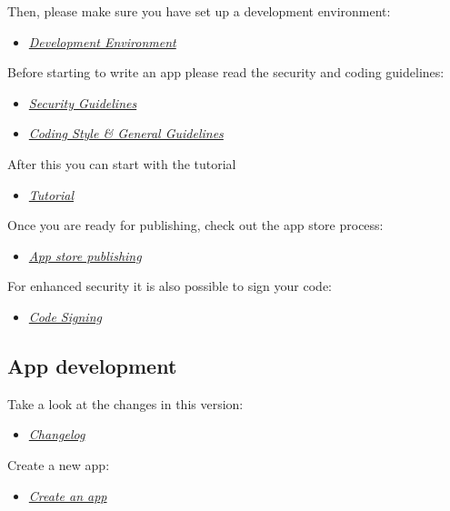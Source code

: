 \documentclass[letterpaper,10pt,english]{sphinxmanual}
\begin{document}
Then, please make sure you have set up a development environment:
\begin{itemize}
\item {} 
{\hyperref[general/devenv::doc]{\emph{\emph{Development Environment}}}}

\end{itemize}

Before starting to write an app please read the security and coding guidelines:
\begin{itemize}
\item {} 
{\hyperref[general/security::doc]{\emph{\emph{Security Guidelines}}}}

\item {} 
{\hyperref[general/codingguidelines::doc]{\emph{\emph{Coding Style \& General Guidelines}}}}

\end{itemize}

After this you can start with the tutorial
\begin{itemize}
\item {} 
{\hyperref[app/tutorial::doc]{\emph{\emph{Tutorial}}}}

\end{itemize}

Once you are ready for publishing, check out the app store process:
\begin{itemize}
\item {} 
{\hyperref[app/publishing::doc]{\emph{\emph{App store publishing}}}}

\end{itemize}

For enhanced security it is also possible to sign your code:
\begin{itemize}
\item {} 
{\hyperref[app/code_signing::doc]{\emph{\emph{Code Signing}}}}

\end{itemize}


\subsection{App development}
\label{app/index:id1}
Take a look at the changes in this version:
\begin{itemize}
\item {} 
{\hyperref[app/changelog::doc]{\emph{\emph{Changelog}}}}

\end{itemize}

Create a new app:
\begin{itemize}
\item {} 
{\hyperref[app/startapp::doc]{\emph{\emph{Create an app}}}}

\end{itemize}
\end{document}
